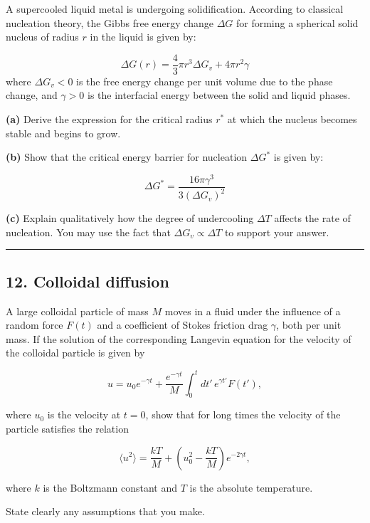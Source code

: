 \documentclass[
  letterpaper,
  enabledeprecatedfontcommands]{report}
\begin{document}
A supercooled liquid metal is undergoing solidification. According to
classical nucleation theory, the Gibbs free energy change \(\Delta G\)
for forming a spherical solid nucleus of radius \(r\) in the liquid is
given by:

\[
\Delta G(r) = \frac{4}{3}\pi r^3 \Delta G_v + 4\pi r^2 \gamma
\] where \(\Delta G_v < 0\) is the free energy change per unit volume
due to the phase change, and \(\gamma > 0\) is the interfacial energy
between the solid and liquid phases.

\textbf{(a)} Derive the expression for the critical radius \(r^*\) at
which the nucleus becomes stable and begins to grow.

\textbf{(b)} Show that the critical energy barrier for nucleation
\(\Delta G^*\) is given by:

\[
\Delta G^* = \frac{16\pi \gamma^3}{3 (\Delta G_v)^2}
\]

\textbf{(c)} Explain qualitatively how the degree of undercooling
\(\Delta T\) affects the rate of nucleation. You may use the fact that
\(\Delta G_v \propto \Delta T\) to support your answer.

\begin{center}\rule{0.5\linewidth}{0.5pt}\end{center}

\subsection*{12. Colloidal diffusion}\label{colloidal-diffusion}

A large colloidal particle of mass \(M\) moves in a fluid under the
influence of a random force \(F(t)\) and a coefficient of Stokes
friction drag \(\gamma\), both per unit mass. If the solution of the
corresponding Langevin equation for the velocity of the colloidal
particle is given by

\[
u = u_0 e^{-\gamma t} + \frac{e^{-\gamma t}}{M} \int_0^t dt' \, e^{\gamma t'} F(t'),
\]

where \(u_0\) is the velocity at \(t = 0\), show that for long times the
velocity of the particle satisfies the relation

\[
\langle u^2 \rangle = \frac{kT}{M} + \left( u_0^2 - \frac{kT}{M} \right) e^{-2\gamma t},
\]

where \(k\) is the Boltzmann constant and \(T\) is the absolute
temperature.

State clearly any assumptions that you make.
\end{document}
